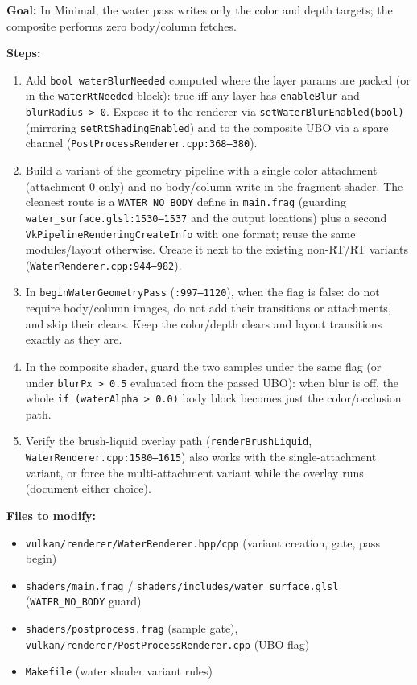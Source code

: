 \documentclass[11pt,a4paper]{article}
\begin{document}
\begin{tcolorbox}[promptbox={Prompt: Skip Body/Column Attachments and Composite Samples When Blur Is Off}]
\textbf{Goal:} In Minimal, the water pass writes only the color and depth targets; the composite performs zero body/column fetches.

\textbf{Steps:}
\begin{enumerate}
    \item Add \texttt{bool waterBlurNeeded} computed where the layer params are packed (or in the \texttt{waterRtNeeded} block): true iff any layer has \texttt{enableBlur} and
    \texttt{blurRadius > 0}. Expose it to the renderer via \texttt{setWaterBlurEnabled(bool)} (mirroring \texttt{setRtShadingEnabled}) and to the composite UBO via a spare channel
    (\texttt{PostProcessRenderer.cpp:368--380}).
    \item Build a variant of the geometry pipeline with a single color attachment (attachment 0 only) and no body/column write in the fragment shader. The cleanest route is a
    \texttt{WATER\_NO\_BODY} define in \texttt{main.frag} (guarding \texttt{water\_surface.glsl:1530--1537} and the output locations) plus a second
    \texttt{VkPipelineRenderingCreateInfo} with one format; reuse the same modules/layout otherwise. Create it next to the existing non-RT/RT variants
    (\texttt{WaterRenderer.cpp:944--982}).
    \item In \texttt{beginWaterGeometryPass} (\texttt{:997--1120}), when the flag is false: do not require body/column images, do not add their transitions or attachments, and
    skip their clears. Keep the color/depth clears and layout transitions exactly as they are.
    \item In the composite shader, guard the two samples under the same flag (or under \texttt{blurPx > 0.5} evaluated from the passed UBO): when blur is off, the whole
    \texttt{if (waterAlpha > 0.0)} body block becomes just the color/occlusion path.
    \item Verify the brush-liquid overlay path (\texttt{renderBrushLiquid}, \texttt{WaterRenderer.cpp:1580--1615}) also works with the single-attachment variant, or force the
    multi-attachment variant while the overlay runs (document either choice).
\end{enumerate}

\textbf{Files to modify:}
\begin{itemize}
    \item \texttt{vulkan/renderer/WaterRenderer.hpp/cpp} (variant creation, gate, pass begin)
    \item \texttt{shaders/main.frag} / \texttt{shaders/includes/water\_surface.glsl} (\texttt{WATER\_NO\_BODY} guard)
    \item \texttt{shaders/postprocess.frag} (sample gate), \texttt{vulkan/renderer/PostProcessRenderer.cpp} (UBO flag)
    \item \texttt{Makefile} (water shader variant rules)
\end{itemize}


\end{tcolorbox}
\end{document}
